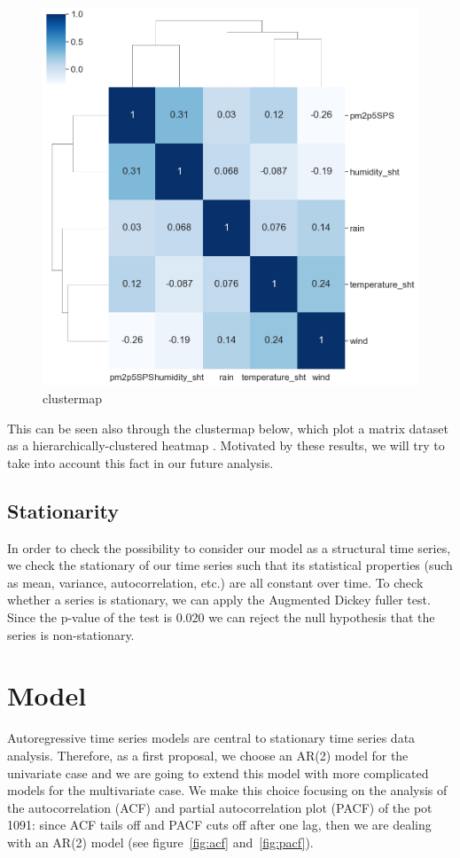 \documentclass{article}
\begin{document}
\begin{figure}
    \centering
    \includegraphics[scale=0.4]{correlations.png}
    \caption{clustermap}
\end{figure}

This can be seen also through the clustermap below, which plot a matrix dataset as a hierarchically-clustered heatmap . 
Motivated by these results, we will try to take into account this fact in our future analysis. 

\subsection{Stationarity}

In order to check the possibility to consider our model as a structural time series, we check the stationary of our time series such that its statistical properties (such as mean, variance, autocorrelation, etc.) are all constant over time. 
To check whether a series is stationary, we can apply the Augmented Dickey fuller test.
Since the p-value of the test is 0.020 we can reject the null hypothesis that the series is non-stationary. 

\section{Model}
Autoregressive time series models are central to stationary time series data analysis. Therefore, as  a first proposal, we choose an AR(2) model for the univariate case and we are going to extend this model with more complicated models for the multivariate case. We make this choice focusing on the analysis of the autocorrelation (ACF) and partial autocorrelation plot (PACF) of the pot 1091: 
since ACF tails off and PACF cuts off after one lag, then we are dealing with an AR(2) model (see figure~\ref{fig:acf} and~\ref{fig:pacf}).
\end{document}
